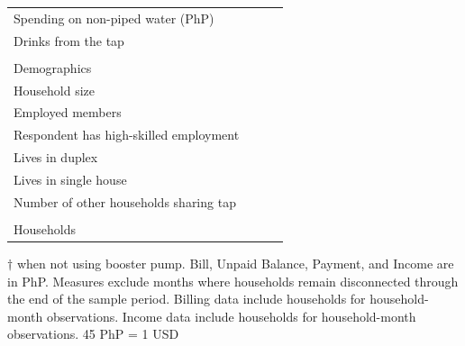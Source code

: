 \documentclass[12pt,table]{article}
\begin{document}
\begin{table}[h!]
\begin{threeparttable}
\begin{tabular}{@{}l*{1}{KKK}@{}}
\hspace{1em}Spending on non-piped water (PhP) &  \\
\hspace{1em}Drinks from the tap &  \\
\\[-.5em]
Demographics \\[.5em]
\hspace{1em}Household size &  \\
\hspace{1em}Employed members &  \\
\hspace{1em}Respondent has high-skilled employment &  \\
\hspace{1em}Lives in duplex&  \\
\hspace{1em}Lives in single house&  \\
\hspace{1em}Number of other households sharing tap&  \\
\\[-.5em]
Households &  \\
\bottomrule
\end{tabular}
\begin{tablenotes}
\footnotesize
\item  $\dagger$ when not using booster pump.  Bill, Unpaid Balance, Payment, and Income are in PhP.  Measures exclude months where households remain disconnected through the end of the sample period.  Billing data include households for household-month observations.  Income data include households for household-month observations.  45 PhP = 1 USD \,\,
\end{tablenotes}
\end{threeparttable}
\end{table}
\end{document}
